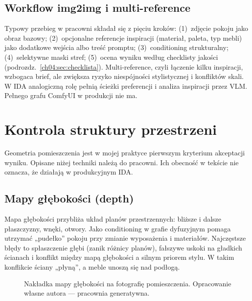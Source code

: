 \subsection{Workflow img2img i multi-reference}
\label{ch04:sec:img2img}

Typowy przebieg w pracowni składał się z pięciu kroków: (1)~zdjęcie pokoju jako obraz bazowy; (2)~opcjonalne referencje inspiracji (materiał, paleta, typ mebli) jako dodatkowe wejścia albo treść promptu; (3)~conditioning strukturalny; (4)~selektywne maski stref; (5)~ocena wyniku według checklisty jakości (podrozdz.~\ref{ch04:sec:checklista}).
Multi-reference, czyli łączenie kilku inspiracji, wzbogaca brief, ale zwiększa ryzyko niespójności stylistycznej i konfliktów skali.
W IDA analogiczną rolę pełnią ścieżki preferencji i analiza inspiracji przez VLM. Pełnego grafu ComfyUI w produkcji nie ma.

\section{Kontrola struktury przestrzeni}
\label{ch04:sec:struktura}

Geometria pomieszczenia jest w mojej praktyce pierwszym kryterium akceptacji wyniku. Opisane niżej techniki należą do pracowni. Ich obecność w tekście nie oznacza, że działają w produkcyjnym IDA.

\subsection{Mapy głębokości (depth)}
\label{ch04:sec:depth}

Mapa głębokości przybliża układ planów przestrzennych: bliższe i dalsze płaszczyzny, wnęki, otwory. Jako conditioning w grafie dyfuzyjnym pomaga utrzymać „pudełko” pokoju przy zmianie wyposażenia i materiałów.
Najczęstsze błędy to spłaszczenie głębi (zanik różnicy planów), fałszywe uskoki na gładkich ścianach i konflikt między mapą głębokości a silnym priorem stylu. W takim konflikcie ściany „płyną”, a meble unoszą się nad podłogą.

\begin{figure}[htbp]
  \centering
  \caption{Nakładka mapy głębokości na fotografię pomieszczenia.
  Opracowanie własne autora --- pracownia generatywna.}
  \label{fig:ch04:depth}
\end{figure}

